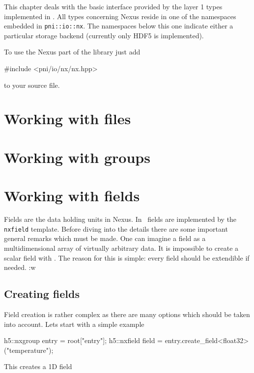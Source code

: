 
This chapter deals with the basic interface provided by the layer 1 types
implemented in \libpniio. All types concerning Nexus reside in one of the
namespaces embedded in {\tt pni::io::nx}. The namespaces below this one 
indicate either a particular storage backend (currently only HDF5 is
implemented).

To use the Nexus part of the library just add 
\begin{cppcode}
#include <pni/io/nx/nx.hpp>
\end{cppcode}
to your source file. 

\section{Working with files}



\section{Working with groups}



\section{Working with fields}

Fields are the data holding units in Nexus.  In \libpniio\ fields are 
implemented by the {\tt nxfield} template. Before diving into the details there
are some important general remarks which must be made. One can imagine a field as a
multidimensional array of virtually arbitrary data. It is impossible to create 
a scalar field with \libpniio. The reason for this is simple: every field should
be extendible if needed. :w


\subsection{Creating fields}

Field creation is rather complex as there are many options which should be taken
into account. Lets start with a simple example
\begin{cppcode}
h5::nxgroup entry = root["entry"];
h5::nxfield field = entry.create_field<float32>("temperature");
\end{cppcode}
This creates a 1D field

